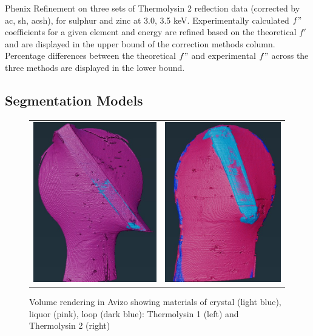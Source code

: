 \begin{table}[H]
\caption{Phenix Refinement on three sets of Thermolysin 2 reflection data (corrected by \ac{ac}, \ac{sh}, \ac{acsh}), for sulphur and zinc at 3.0, 3.5 \unit{keV}. Experimentally calculated $f"$ coefficients for a given element and energy are refined based on the theoretical $f'$ and are displayed in the upper bound of the correction methods column. Percentage differences between the theoretical $f"$ and experimental $f"$ across the three methods are displayed in the lower bound.}
\label{phenix_table}
\end{table}


\newpage

\subsection*{Segmentation Models}

\renewcommand{\thefigure}{A\arabic{figure}}
\setcounter{figure}{0}

\begin{figure}[h]
    \begin{tabular}{cc}
    	\includegraphics[height=7cm ]{images/avizo_flats/tlys9.jpg} & \includegraphics[height=7cm]{images/avizo_flats/tlys2.jpg}
    \end{tabular}
	\caption{Volume rendering in Avizo showing materials of crystal (light blue), liquor (pink), loop (dark blue): Thermolysin 1 (left) and Thermolysin 2 (right)}
 \label{tlys2}
\end{figure}


